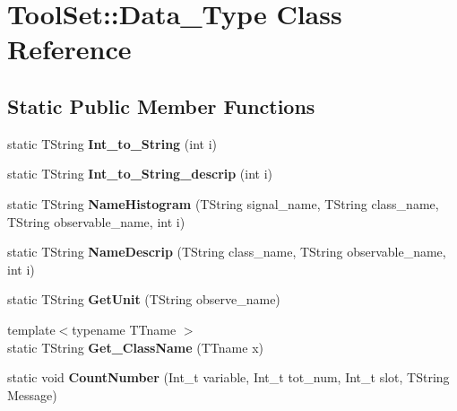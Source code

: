 \hypertarget{classToolSet_1_1Data__Type}{
\section{ToolSet::Data\_\-Type Class Reference}
\label{classToolSet_1_1Data__Type}
}
\subsection*{Static Public Member Functions}
\begin{DoxyCompactItemize}
\item 
\hypertarget{classToolSet_1_1Data__Type_a5a180aac27b1ffee7f3986ee49a36fe4}{
static TString {\bfseries Int\_\-to\_\-String} (int i)}
\label{classToolSet_1_1Data__Type_a5a180aac27b1ffee7f3986ee49a36fe4}

\item 
\hypertarget{classToolSet_1_1Data__Type_a4fc26a3b641aac7be524a433a382b441}{
static TString {\bfseries Int\_\-to\_\-String\_\-descrip} (int i)}
\label{classToolSet_1_1Data__Type_a4fc26a3b641aac7be524a433a382b441}

\item 
\hypertarget{classToolSet_1_1Data__Type_a8b61264c0840610ee889f82be2f022f0}{
static TString {\bfseries NameHistogram} (TString signal\_\-name, TString class\_\-name, TString observable\_\-name, int i)}
\label{classToolSet_1_1Data__Type_a8b61264c0840610ee889f82be2f022f0}

\item 
\hypertarget{classToolSet_1_1Data__Type_aea9d3927dcaa234c68cde2e6211f163d}{
static TString {\bfseries NameDescrip} (TString class\_\-name, TString observable\_\-name, int i)}
\label{classToolSet_1_1Data__Type_aea9d3927dcaa234c68cde2e6211f163d}

\item 
\hypertarget{classToolSet_1_1Data__Type_abb40ebeb54cf0ce92ba515dc7bf511b3}{
static TString {\bfseries GetUnit} (TString observe\_\-name)}
\label{classToolSet_1_1Data__Type_abb40ebeb54cf0ce92ba515dc7bf511b3}

\item 
\hypertarget{classToolSet_1_1Data__Type_a58ea713ea83dec25b0804dec752deac2}{
{\footnotesize template$<$typename TTname $>$ }\\static TString {\bfseries Get\_\-ClassName} (TTname x)}
\label{classToolSet_1_1Data__Type_a58ea713ea83dec25b0804dec752deac2}

\item 
\hypertarget{classToolSet_1_1Data__Type_ab9c3d77c777ef08fca543e1681472577}{
static void {\bfseries CountNumber} (Int\_\-t variable, Int\_\-t tot\_\-num, Int\_\-t slot, TString Message)}
\label{classToolSet_1_1Data__Type_ab9c3d77c777ef08fca543e1681472577}


\end{DoxyCompactItemize}
